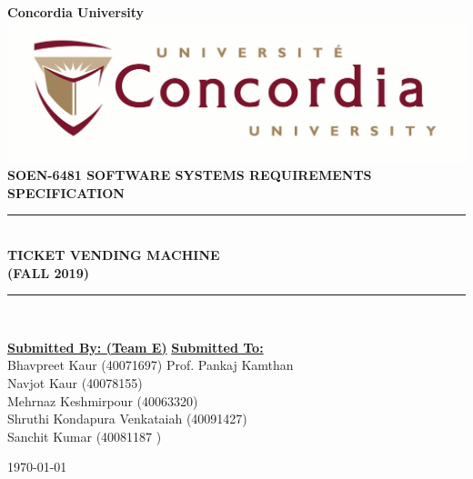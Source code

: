 \documentclass[a4paper,12pt]{report}
\newcommand{\TermName}{FALL 2019}
\newcommand{\Course}{\textbf{SOEN-6481 \vspace{0.5cm} SOFTWARE SYSTEMS REQUIREMENTS SPECIFICATION}}
\begin{document}

\begin{titlepage}
\newcommand{\HRule}{\rule{\linewidth}{0.5mm}} %


\centering
\textbf{\LARGE  Concordia University} \\ [5mm] 
\includegraphics[scale=.1]{University_logo.jpg}\\[1cm] 
\textsc{\Large \Course} \\ [0.5cm]

	
\HRule \\[0.4cm]
{ \huge \bfseries TICKET VENDING MACHINE \\ [5mm]  (\TermName)}\\[0.4cm] 
\HRule \\[1.5cm]


\vspace{4cm}

\begin{flushleft}


\textbf{\underline{\Large Submitted By: (Team E)}}
\hfill
\textbf{\underline{\Large Submitted To:}} \\
\vspace{3mm}
\large Bhavpreet Kaur (40071697)
\hfill
\large Prof. Pankaj Kamthan \\

\large Navjot Kaur (40078155) \hfill \\
\large Mehrnaz Keshmirpour (40063320) \hfill \\
\large Shruthi Kondapura Venkataiah (40091427) \hfill \\
\large Sanchit Kumar (40081187	) \\

\end{flushleft}

\vspace{1.5cm}
{\large \today}\\[2cm]

\vfill
\end{titlepage}
\end{document}
